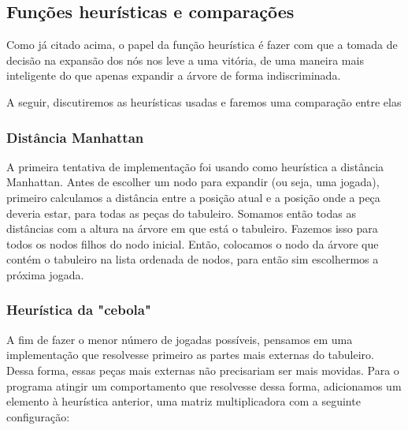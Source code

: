 \documentclass[a4paper,11pt]{article}
\begin{document}

\subsection{Funções heurísticas e comparações}
Como já citado acima, o papel da função heurística é fazer com que a tomada de
decisão na expansão dos nós nos leve a uma vitória, de uma maneira mais inteligente 
do que apenas expandir a árvore de forma indiscriminada.

A seguir, discutiremos as heurísticas usadas e faremos uma comparação entre elas

\subsubsection {Distância Manhattan}
A primeira tentativa de implementação foi usando como heurística a distância Manhattan.
Antes de escolher um nodo para expandir (ou seja, uma jogada), primeiro calculamos a distância entre a 
posição atual e a posição onde a peça deveria estar, para todas as peças do tabuleiro. Somamos então todas as distâncias com a altura 
na árvore em que está o tabuleiro. Fazemos isso para todos os nodos filhos do nodo inicial. 
Então, colocamos o nodo da árvore que contém o tabuleiro na lista ordenada de nodos, para então sim escolhermos a próxima jogada.

\subsubsection {Heurística da "cebola"}
A fim de fazer o menor número de jogadas possíveis, pensamos em uma implementação que resolvesse primeiro as partes mais externas do tabuleiro. 
Dessa forma, essas peças mais externas não precisariam ser mais movidas. Para o programa atingir um comportamento que resolvesse dessa forma, 
adicionamos um elemento à heurística anterior, uma matriz multiplicadora com a seguinte configuração:
\end{document}
